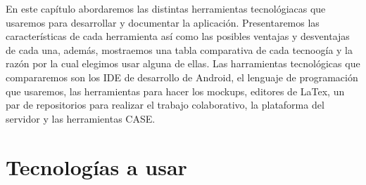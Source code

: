 En este capítulo abordaremos las distintas herramientas tecnológiacas que usaremos para desarrollar y documentar la aplicación. Presentaremos las características de cada herramienta así como las posibles ventajas y desventajas de cada una, además, mostraemos una tabla comparativa de cada tecnoogía y la razón por la cual elegimos usar alguna de ellas.
Las harramientas tecnológicas que compararemos son los IDE de desarrollo de Android, el lenguaje de programación que usaremos, las herramientas para hacer los mockups, editores de LaTex, un par de repositorios para realizar el trabajo colaborativo, la plataforma del servidor y las herramientas CASE.

\section{Tecnologías a usar}

